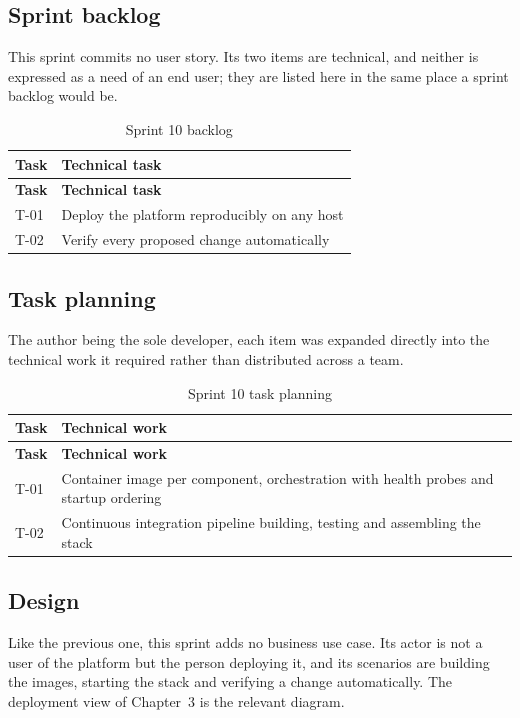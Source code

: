 \subsection{Sprint backlog}
This sprint commits no user story. Its two items are technical, and neither is expressed as
a need of an end user; they are listed here in the same place a sprint backlog would be.

\begin{longtable}{|m{1.6cm}|m{12.4cm}|}
\caption{Sprint 10 backlog}\label{tab:sb10}\\
\hline
\textbf{Task} & \textbf{Technical task} \\
\hline
\endfirsthead
\hline
\textbf{Task} & \textbf{Technical task} \\
\hline
\endhead
\endfoot
\endlastfoot
\hline
T-01 & Deploy the platform reproducibly on any host \\
\hline
T-02 & Verify every proposed change automatically \\
\hline
\end{longtable}

\subsection{Task planning}
The author being the sole developer, each item was expanded directly into the technical work it
required rather than distributed across a team.

\begin{longtable}{|m{1.6cm}|m{12.4cm}|}
\caption{Sprint 10 task planning}\label{tab:tp10}\\
\hline
\textbf{Task} & \textbf{Technical work} \\
\hline
\endfirsthead
\hline
\textbf{Task} & \textbf{Technical work} \\
\hline
\endhead
\endfoot
\endlastfoot
\hline
T-01 & Container image per component, orchestration with health probes and startup ordering \\
\hline
T-02 & Continuous integration pipeline building, testing and assembling the stack \\
\hline
\end{longtable}

\subsection{Design}
Like the previous one, this sprint adds no business use case. Its actor is not a user of the
platform but the person deploying it, and its scenarios are building the images, starting the stack
and verifying a change automatically. The deployment view of Chapter~3 is the relevant diagram.

